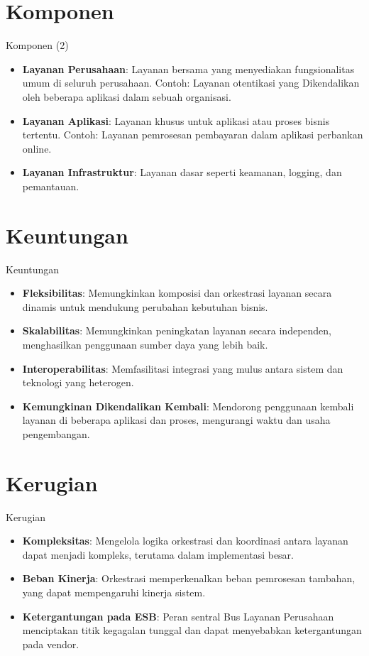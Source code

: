 \documentclass[aspectratio=169, table]{beamer}
\begin{document}
   \section{Komponen}
   \begin{frame}{Komponen (2)}
       \begin{itemize}
           \item \textbf{Layanan Perusahaan}: Layanan bersama yang menyediakan fungsionalitas umum di seluruh perusahaan. Contoh: Layanan otentikasi yang Dikendalikan oleh beberapa aplikasi dalam sebuah organisasi.
           \item \textbf{Layanan Aplikasi}: Layanan khusus untuk aplikasi atau proses bisnis tertentu. Contoh: Layanan pemrosesan pembayaran dalam aplikasi perbankan online.
           \item \textbf{Layanan Infrastruktur}: Layanan dasar seperti keamanan, logging, dan pemantauan.
       \end{itemize}
   \end{frame}

   \section{Keuntungan}
   \begin{frame}{Keuntungan}
       \begin{itemize}
           \item \textbf{Fleksibilitas}: Memungkinkan komposisi dan orkestrasi layanan secara dinamis untuk mendukung perubahan kebutuhan bisnis.
           \item \textbf{Skalabilitas}: Memungkinkan peningkatan layanan secara independen, menghasilkan penggunaan sumber daya yang lebih baik.
           \item \textbf{Interoperabilitas}: Memfasilitasi integrasi yang mulus antara sistem dan teknologi yang heterogen.
           \item \textbf{Kemungkinan Dikendalikan Kembali}: Mendorong penggunaan kembali layanan di beberapa aplikasi dan proses, mengurangi waktu dan usaha pengembangan.
       \end{itemize}
   \end{frame}

   \section{Kerugian}
   \begin{frame}{Kerugian}
       \begin{itemize}
           \item \textbf{Kompleksitas}: Mengelola logika orkestrasi dan koordinasi antara layanan dapat menjadi kompleks, terutama dalam implementasi besar.
           \item \textbf{Beban Kinerja}: Orkestrasi memperkenalkan beban pemrosesan tambahan, yang dapat mempengaruhi kinerja sistem.
           \item \textbf{Ketergantungan pada ESB}: Peran sentral Bus Layanan Perusahaan menciptakan titik kegagalan tunggal dan dapat menyebabkan ketergantungan pada vendor.
       \end{itemize}
   \end{frame}
\end{document}
